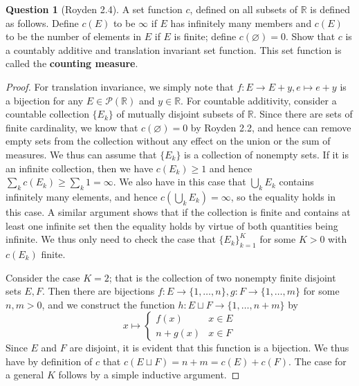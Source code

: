 \documentclass{article}
\newcommand{\R}{\mathbb{R}}
\theoremstyle{definition} %
\numberwithin{thm}{section} %
\theoremstyle{definition} %
\newtheorem{question}[thm]{Question}
\begin{document}
\begin{question}[Royden 2.4]
A set function $c$, defined on all subsets of $\R$ is defined as follows. Define $c(E)$ to be $\infty$ if $E$ has infinitely many members and $c(E)$ to be the number of elements in $E$ if $E$ is finite; define $c(\varnothing) = 0$. Show that $c$ is a countably additive and translation invariant set function. This set function is called the \textbf{counting measure}.
\end{question}
\begin{proof}
For translation invariance, we simply note that $f: E \to E + y, e \mapsto e + y$ is a bijection for any $E \in \mathcal{P}(\R)$ and $y \in \R$. For countable additivity, consider a countable collection $\{E_k\}$ of mutually disjoint subsets of $\R$. Since there are sets of finite cardinality, we know that $c(\varnothing) = 0$ by Royden 2.2, and hence can remove empty sets from the collection without any effect on the union or the sum of measures. We thus can assume that $\{E_k\}$ is a collection of nonempty sets. If it is an infinite collection, then we have $c(E_k) \geq 1$ and hence $\sum_k c(E_k) \geq \sum_k 1 = \infty$. We also have in this case that $\bigcup_k E_k$ contains infinitely many elements, and hence $c(\bigcup_k E_k) = \infty$, so the equality holds in this case. A similar argument shows that if the collection is finite and contains at least one infinite set then the equality holds by virtue of both quantities being infinite. We thus only need to check the case that ${\{E_k\}}_{k = 1}^K$ for some $K > 0$ with $c(E_k)$ finite. 

Consider the case $K = 2$; that is the collection of two nonempty finite disjoint sets $E, F$. Then there are bijections $f: E \to \{1, \dots, n\}, g: F \to \{1, \dots, m\}$ for some $n, m > 0$, and we construct the function $h: E \sqcup F \to \{1, \dots, n + m\}$ by \[ x \mapsto \begin{cases}
    f(x) & x \in E \\ n + g(x) & x \in F
\end{cases} \]
Since $E$ and $F$ are disjoint, it is evident that this function is a bijection. We thus have by definition of $c$ that $c(E \sqcup F) = n + m = c(E) + c(F)$. The case for a general $K$ follows by a simple inductive argument.
\end{proof}
\end{document}
